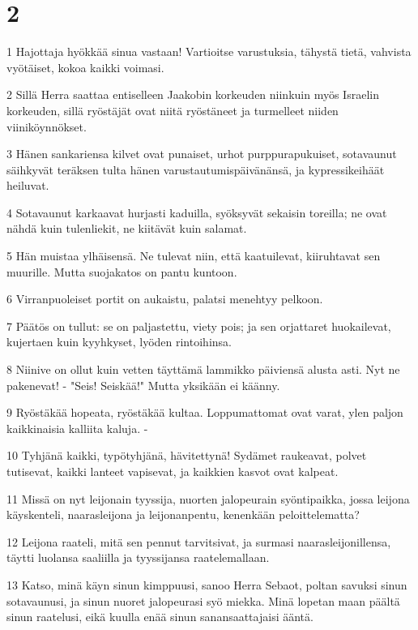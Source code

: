\chapter{2}

\par 1 Hajottaja hyökkää sinua vastaan! Vartioitse varustuksia, tähystä tietä, vahvista vyötäiset, kokoa kaikki voimasi.
\par 2 Sillä Herra saattaa entiselleen Jaakobin korkeuden niinkuin myös Israelin korkeuden, sillä ryöstäjät ovat niitä ryöstäneet ja turmelleet niiden viiniköynnökset.
\par 3 Hänen sankariensa kilvet ovat punaiset, urhot purppurapukuiset, sotavaunut säihkyvät teräksen tulta hänen varustautumispäivänänsä, ja kypressikeihäät heiluvat.
\par 4 Sotavaunut karkaavat hurjasti kaduilla, syöksyvät sekaisin toreilla; ne ovat nähdä kuin tulenliekit, ne kiitävät kuin salamat.
\par 5 Hän muistaa ylhäisensä. Ne tulevat niin, että kaatuilevat, kiiruhtavat sen muurille. Mutta suojakatos on pantu kuntoon.
\par 6 Virranpuoleiset portit on aukaistu, palatsi menehtyy pelkoon.
\par 7 Päätös on tullut: se on paljastettu, viety pois; ja sen orjattaret huokailevat, kujertaen kuin kyyhkyset, lyöden rintoihinsa.
\par 8 Niinive on ollut kuin vetten täyttämä lammikko päiviensä alusta asti. Nyt ne pakenevat! - "Seis! Seiskää!" Mutta yksikään ei käänny.
\par 9 Ryöstäkää hopeata, ryöstäkää kultaa. Loppumattomat ovat varat, ylen paljon kaikkinaisia kalliita kaluja. -
\par 10 Tyhjänä kaikki, typötyhjänä, hävitettynä! Sydämet raukeavat, polvet tutisevat, kaikki lanteet vapisevat, ja kaikkien kasvot ovat kalpeat.
\par 11 Missä on nyt leijonain tyyssija, nuorten jalopeurain syöntipaikka, jossa leijona käyskenteli, naarasleijona ja leijonanpentu, kenenkään peloittelematta?
\par 12 Leijona raateli, mitä sen pennut tarvitsivat, ja surmasi naarasleijonillensa, täytti luolansa saaliilla ja tyyssijansa raatelemallaan.
\par 13 Katso, minä käyn sinun kimppuusi, sanoo Herra Sebaot, poltan savuksi sinun sotavaunusi, ja sinun nuoret jalopeurasi syö miekka. Minä lopetan maan päältä sinun raatelusi, eikä kuulla enää sinun sanansaattajaisi ääntä.

